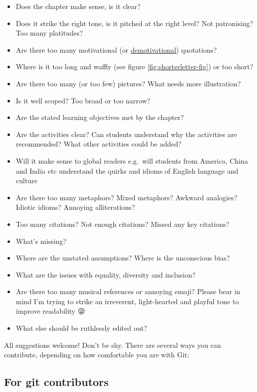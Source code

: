 \documentclass[
]{book}
\providecommand{\tightlist}{%
  \setlength{\itemsep}{0pt}\setlength{\parskip}{0pt}}
\begin{document}
\begin{itemize}
\tightlist
\item
  Does the chapter make sense, is it clear?
\item
  Does it strike the right tone, is it pitched at the right level? Not patronising? Too many platitudes?
\item
  Are there too many motivational (or \href{https://despair.com/collections/demotivators}{demotivational}) quotations?
\item
  Where is it too long and waffly (see figure \ref{fig:shorterletter-fig}) or too short?
\item
  Are there too many (or too few) pictures? What needs more illustration?
\item
  Is it well scoped? Too broad or too narrow?
\item
  Are the stated learning objectives met by the chapter?
\item
  Are the activities clear? Can students understand why the activities are recommended? What other activities could be added?
\item
  Will it make sense to global readers e.g.~will students from America, China and India etc understand the quirks and idioms of English language and culture
\item
  Are there too many metaphors? Mixed metaphors? Awkward analogies? Idiotic idioms? Annoying alliterations?
\item
  Too many citations? Not enough citations? Missed any key citations?
\item
  What's missing?
\item
  Where are the unstated assumptions? Where is the unconscious bias?
\item
  What are the issues with equality, diversity and inclusion?
\item
  Are there too many musical references or annoying emoji? Please bear in mind I'm trying to strike an irreverent, light-hearted and playful tone to improve readability 😜
\item
  What else should be ruthlessly edited out?
\end{itemize}

All suggestions welcome! Don't be shy. There are several ways you can contribute, depending on how comfortable you are with Git:

\hypertarget{techies}{%
\subsection{For git contributors}\label{techies}}
\end{document}
